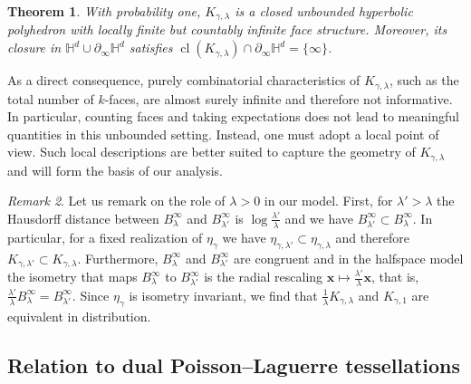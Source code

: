 \documentclass[11pt,a4paper]{article}
\theoremstyle{plain}
\newtheorem{theorem}{Theorem}
\theoremstyle{definition}
\theoremstyle{remark}
\newtheorem{remark}[theorem]{Remark}
\newcommand{\bx}{\boldsymbol{x}}
\def\HH{\mathbb{H}}
\begin{document}
\begin{theorem}\label{thm:UnboundedOneEnded}
	With probability one, $K_{\gamma,\lambda}$ is a closed unbounded hyperbolic
	polyhedron with locally finite but countably infinite face structure.
	Moreover, its closure in $\HH^d\cup\partial_\infty\HH^d$ satisfies $\operatorname{cl}(K_{\gamma,\lambda})\cap\partial_\infty\HH^d=\{\infty\}$.
\end{theorem}


As a direct consequence, purely combinatorial characteristics of $K_{\gamma,\lambda}$, such as the total number of $k$-faces, are almost surely infinite and therefore not informative. In particular, counting faces and taking expectations does not lead to meaningful quantities in this unbounded setting. Instead, one must adopt a local point of view. Such local descriptions are better suited to capture the geometry of $K_{\gamma,\lambda}$ and will form the basis of our analysis.

\begin{remark}\label{rmk:Lambda_iso}
	Let us remark on the role of $\lambda>0$ in our model. First, for $\lambda'>\lambda$ the Hausdorff distance between $B^\infty_{\lambda}$ and $B^\infty_{\lambda'}$ is $\log \frac{\lambda'}{\lambda}$ and we have $B^\infty_{\lambda'}\subset B^\infty_{\lambda}$. In particular, for a fixed realization of $\eta_{\gamma}$ we have
	$\eta_{\gamma,\lambda'}\subset \eta_{\gamma,\lambda}$ and therefore $K_{\gamma,\lambda'}\subset K_{\gamma,\lambda}$.
	Furthermore, $B^\infty_{\lambda}$ and $B^\infty_{\lambda'}$ are congruent and in the halfspace model the isometry that maps $B^\infty_\lambda$ to $B^\infty_{\lambda'}$ is the radial rescaling $\bx\mapsto \frac{\lambda'}{\lambda}\bx$, that is, $\frac{\lambda'}{\lambda} B^\infty_{\lambda} = B^\infty_{\lambda'}$.
	Since $\eta_{\gamma}$ is isometry invariant, we find that $\frac{1}{\lambda} K_{\gamma,\lambda}$ and $K_{\gamma,1}$ are equivalent in distribution.
\end{remark}

\subsection{Relation to dual Poisson--Laguerre tessellations}
\end{document}
